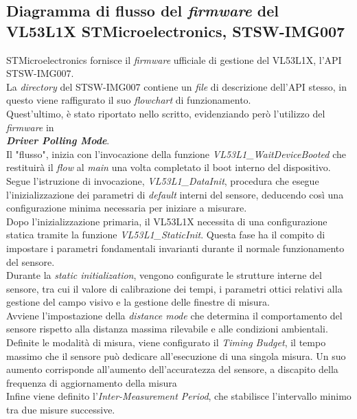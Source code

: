 \documentclass[11pt]{report}
\begin{document}
\subsection{Diagramma di flusso del \textit{firmware} del VL53L1X STMicroelectronics, STSW-IMG007}
STMicroelectronics fornisce il \textit{firmware} ufficiale di gestione del VL53L1X, l'API \\
STSW-IMG007.\\
La \textit{directory} del STSW-IMG007 contiene un \textit{file} di descrizione dell'API stesso, in questo viene raffigurato il suo \textit{flowchart} di funzionamento.\\
Quest'ultimo, è stato riportato nello scritto, evidenziando però l'utilizzo del \textit{firmware} in\\\textbf{\textit{Driver Polling Mode}}.\\
Il "flusso", inizia con l'invocazione della funzione \textit{VL53L1\_WaitDeviceBooted} che restituirà il \textit{flow} al \textit{main} una volta completato il boot interno del dispositivo.\\
Segue l'istruzione di invocazione, \textit{VL53L1\_DataInit}, procedura che esegue l'inizializzazione dei parametri di \textit{default} interni del sensore, deducendo così una configurazione minima necessaria per iniziare a misurare.\\
Dopo l'inizializzazione primaria, il VL53L1X necessita di una configurazione statica tramite la funzione \textit{VL53L1\_StaticInit}. Questa fase ha il compito di impostare i parametri fondamentali invarianti durante il normale funzionamento del sensore.\\
Durante la \textit{static initialization}, vengono configurate le strutture interne del sensore, tra cui il valore di calibrazione dei tempi, i parametri ottici relativi alla gestione del campo visivo e la gestione delle finestre di misura.\\
Avviene l'impostazione della \textit{distance mode} che determina il comportamento del sensore rispetto alla distanza massima rilevabile e alle condizioni ambientali.\\
Definite le modalità di misura, viene configurato il \textit{Timing Budget}, il tempo massimo che il sensore può dedicare all'esecuzione di una singola misura. Un suo aumento corrisponde all'aumento dell'accuratezza del sensore, a discapito della frequenza di aggiornamento della misura\\
Infine viene definito l'\textit{Inter-Measurement Period}, che stabilisce l'intervallo minimo tra due misure successive.\\
\end{document}
